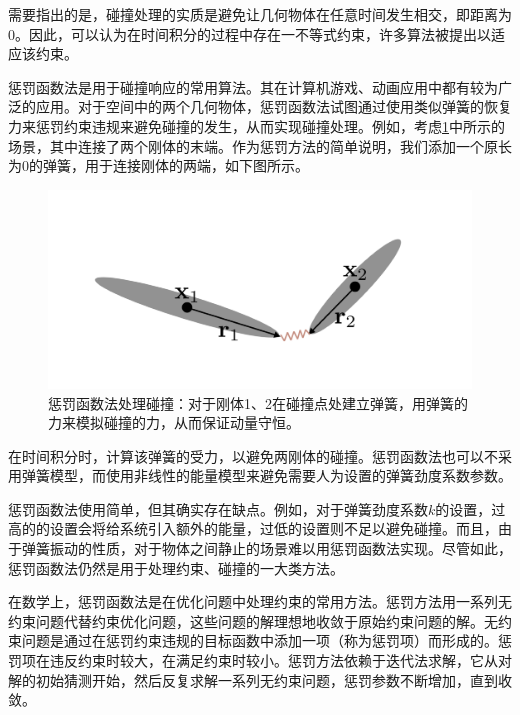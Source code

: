 需要指出的是，碰撞处理的实质是避免让几何物体在任意时间发生相交，即距离为 $0$。因此，可以认为在时间积分的过程中存在一不等式约束，许多算法被提出以适应该约束。


惩罚函数法是用于碰撞响应的常用算法。其在计算机游戏、动画应用中都有较为广泛的应用。对于空间中的两个几何物体，惩罚函数法试图通过使用类似弹簧的恢复力来惩罚约束违规来避免碰撞的发生，从而实现碰撞处理。例如，考虑\ref{fig:penalty-force-illust}中所示的场景，其中连接了两个刚体的末端。作为惩罚方法的简单说明，我们添加一个原长为$0$的弹簧，用于连接刚体的两端，如下图所示。
\begin{figure}[hbt]
  \centering
  \includegraphics[width=0.5\linewidth]{img/Screenshot 2023-04-23 at 10.32.55.png}
  \caption{惩罚函数法处理碰撞：对于刚体1、2在碰撞点处建立弹簧，用弹簧的力来模拟碰撞的力，从而保证动量守恒。}\label{fig:penalty-force-illust}
\end{figure}

在时间积分时，计算该弹簧的受力，以避免两刚体的碰撞。惩罚函数法也可以不采用弹簧模型，而使用非线性的能量模型来避免需要人为设置的弹簧劲度系数参数。

惩罚函数法使用简单，但其确实存在缺点。例如，对于弹簧劲度系数$k$的设置，过高的的设置会将给系统引入额外的能量，过低的设置则不足以避免碰撞。而且，由于弹簧振动的性质，对于物体之间静止的场景难以用惩罚函数法实现。尽管如此，惩罚函数法仍然是用于处理约束、碰撞的一大类方法。

在数学上，惩罚函数法是在优化问题中处理约束的常用方法。惩罚方法用一系列无约束问题代替约束优化问题，这些问题的解理想地收敛于原始约束问题的解。无约束问题是通过在惩罚约束违规的目标函数中添加一项（称为惩罚项）而形成的。惩罚项在违反约束时较大，在满足约束时较小。惩罚方法依赖于迭代法求解，它从对解的初始猜测开始，然后反复求解一系列无约束问题，惩罚参数不断增加，直到收敛。%


